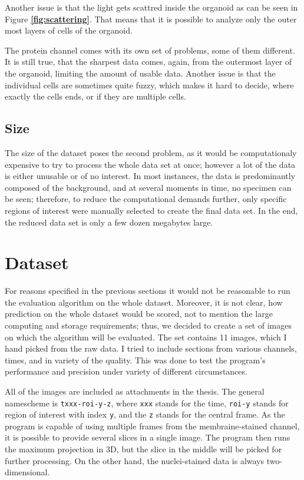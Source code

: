 \documentclass[
  digital,     %
  oneside,     %
  nosansbold,  %
  nocolorbold, %
  lof,         %
  lot,         %
]{fithesis4}
\begin{document}
Another issue is that the light gets scattred inside the organoid as can be seen
in Figure \textbf{\ref{fig:scattering}}. That means that it is possible to analyze only the
outer most layers of cells of the organoid.

The protein channel comes with its own set of problems, some of them different.
It is still true, that the sharpest data comes, again, from the outermost layer
of the organoid, limiting the amount of usable data. Another issue is that the
individual cells are sometimes quite fuzzy, which makes it hard to decide, where
exactly the cells ends, or if they are multiple cells.

\subsection{Size}

The size of the dataset poses the second problem, as it would be computationaly
expensive to try to process the whole data set at once; however a lot of the
data is either unusable or of no interest. In most instances, the data is
predominantly composed of the background, and at several moments in time, no
specimen can be seen; therefore, to reduce the computational demands further,
only specific regions of interest were manually selected to create the final
data set. In the end, the reduced data set is only a few dozen megabytes large.

\section{Dataset}

For reasons specified in the previous sections it would not be reasonable
to run the evaluation algorithm on the whole dataset. Moreover, it is not clear,
how prediction on the whole dataset would be scored, not to mention the large
computing and storage requirements; thus, we decided to create a set of images
on which the algorithm will be evaluated. The set contains 11 images, which I
hand picked from the raw data. I tried to include sections from various
channels, times, and in variety of the quality. This was done to test the
program's performance and precision under variety of different circumstances.


All of the images are included as attachments in the thesis. The general
namescheme is \texttt{txxx-roi-y-z}, where \texttt{xxx} stands for the time,
\texttt{roi-y} stands for region of interest with index \texttt{y}, and the
\texttt{z} stands for the central frame. As the program is capable of using
multiple frames from the membraine-stained channel, it is possible to provide
several slices in a single image. The program then runs the maximum projection
in 3D, but the slice in the middle will be picked for further processing. On the
other hand, the nuclei-stained data is always two-dimensional.
\end{document}
